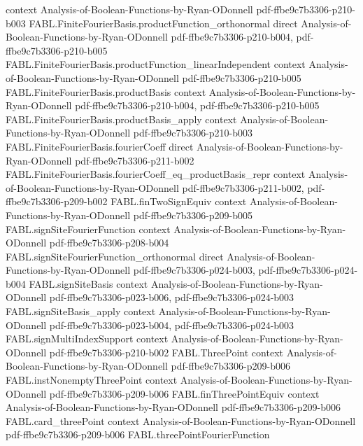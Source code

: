 \begin{theorem}
  {context}
  {Analysis-of-Boolean-Functions-by-Ryan-ODonnell}
  {pdf-ffbe9c7b3306-p210-b003}
\proofstep
  {FABL.FiniteFourierBasis.productFunction_orthonormal}
  {direct}
  {Analysis-of-Boolean-Functions-by-Ryan-ODonnell}
  {pdf-ffbe9c7b3306-p210-b004,
    pdf-ffbe9c7b3306-p210-b005}
\proofstep
  {FABL.FiniteFourierBasis.productFunction_linearIndependent}
  {context}
  {Analysis-of-Boolean-Functions-by-Ryan-ODonnell}
  {pdf-ffbe9c7b3306-p210-b005}
\proofstep
  {FABL.FiniteFourierBasis.productBasis}
  {context}
  {Analysis-of-Boolean-Functions-by-Ryan-ODonnell}
  {pdf-ffbe9c7b3306-p210-b004,
    pdf-ffbe9c7b3306-p210-b005}
\proofstep
  {FABL.FiniteFourierBasis.productBasis_apply}
  {context}
  {Analysis-of-Boolean-Functions-by-Ryan-ODonnell}
  {pdf-ffbe9c7b3306-p210-b003}
\proofstep
  {FABL.FiniteFourierBasis.fourierCoeff}
  {direct}
  {Analysis-of-Boolean-Functions-by-Ryan-ODonnell}
  {pdf-ffbe9c7b3306-p211-b002}
\proofstep
  {FABL.FiniteFourierBasis.fourierCoeff_eq_productBasis_repr}
  {context}
  {Analysis-of-Boolean-Functions-by-Ryan-ODonnell}
  {pdf-ffbe9c7b3306-p211-b002,
    pdf-ffbe9c7b3306-p209-b002}
\proofstep
  {FABL.finTwoSignEquiv}
  {context}
  {Analysis-of-Boolean-Functions-by-Ryan-ODonnell}
  {pdf-ffbe9c7b3306-p209-b005}
\proofstep
  {FABL.signSiteFourierFunction}
  {context}
  {Analysis-of-Boolean-Functions-by-Ryan-ODonnell}
  {pdf-ffbe9c7b3306-p208-b004}
\proofstep
  {FABL.signSiteFourierFunction_orthonormal}
  {direct}
  {Analysis-of-Boolean-Functions-by-Ryan-ODonnell}
  {pdf-ffbe9c7b3306-p024-b003,
    pdf-ffbe9c7b3306-p024-b004}
\proofstep
  {FABL.signSiteBasis}
  {context}
  {Analysis-of-Boolean-Functions-by-Ryan-ODonnell}
  {pdf-ffbe9c7b3306-p023-b006,
    pdf-ffbe9c7b3306-p024-b003}
\proofstep
  {FABL.signSiteBasis_apply}
  {context}
  {Analysis-of-Boolean-Functions-by-Ryan-ODonnell}
  {pdf-ffbe9c7b3306-p023-b004,
    pdf-ffbe9c7b3306-p024-b003}
\proofstep
  {FABL.signMultiIndexSupport}
  {context}
  {Analysis-of-Boolean-Functions-by-Ryan-ODonnell}
  {pdf-ffbe9c7b3306-p210-b002}
\proofstep
  {FABL.ThreePoint}
  {context}
  {Analysis-of-Boolean-Functions-by-Ryan-ODonnell}
  {pdf-ffbe9c7b3306-p209-b006}
\proofstep
  {FABL.instNonemptyThreePoint}
  {context}
  {Analysis-of-Boolean-Functions-by-Ryan-ODonnell}
  {pdf-ffbe9c7b3306-p209-b006}
\proofstep
  {FABL.finThreePointEquiv}
  {context}
  {Analysis-of-Boolean-Functions-by-Ryan-ODonnell}
  {pdf-ffbe9c7b3306-p209-b006}
\proofstep
  {FABL.card_threePoint}
  {context}
  {Analysis-of-Boolean-Functions-by-Ryan-ODonnell}
  {pdf-ffbe9c7b3306-p209-b006}
\proofstep
  {FABL.threePointFourierFunction}

\end{theorem}
